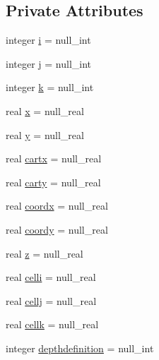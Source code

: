 \subsection*{Private Attributes}
\begin{DoxyCompactItemize}
\item 
integer \mbox{\hyperlink{structmodulelagrangianglobal_1_1t__position_af745ee6a210934fb981a149ae28ca6d4}{i}} = null\+\_\+int
\item 
integer \mbox{\hyperlink{structmodulelagrangianglobal_1_1t__position_ab99a1e12ce13909aae62e74a14dc0585}{j}} = null\+\_\+int
\item 
integer \mbox{\hyperlink{structmodulelagrangianglobal_1_1t__position_aae3f60b09150d9bec7d2f574b0bd8ecf}{k}} = null\+\_\+int
\item 
real \mbox{\hyperlink{structmodulelagrangianglobal_1_1t__position_ae10ba11e0f047cf9813bc1352e8da7e9}{x}} = null\+\_\+real
\item 
real \mbox{\hyperlink{structmodulelagrangianglobal_1_1t__position_a43baf1ee3465c8f6f57dae876045d290}{y}} = null\+\_\+real
\item 
real \mbox{\hyperlink{structmodulelagrangianglobal_1_1t__position_afb00ff6e531d7837c6c1c2917f4bff6f}{cartx}} = null\+\_\+real
\item 
real \mbox{\hyperlink{structmodulelagrangianglobal_1_1t__position_a610ac2aa6f3adea2efcbd677201a5ec0}{carty}} = null\+\_\+real
\item 
real \mbox{\hyperlink{structmodulelagrangianglobal_1_1t__position_ac4ffc10253f2729406cbc21416c5646a}{coordx}} = null\+\_\+real
\item 
real \mbox{\hyperlink{structmodulelagrangianglobal_1_1t__position_ac759900575ba7079e943d89c2de19517}{coordy}} = null\+\_\+real
\item 
real \mbox{\hyperlink{structmodulelagrangianglobal_1_1t__position_a2ff1e683bb89b4f5dca0c0a5385e9a4e}{z}} = null\+\_\+real
\item 
real \mbox{\hyperlink{structmodulelagrangianglobal_1_1t__position_a92f50dce6255330460a4d2b6ab7dfe2c}{celli}} = null\+\_\+real
\item 
real \mbox{\hyperlink{structmodulelagrangianglobal_1_1t__position_a96e100986a5800c6237f64b85757691b}{cellj}} = null\+\_\+real
\item 
real \mbox{\hyperlink{structmodulelagrangianglobal_1_1t__position_ab0ff668eb316d7445d36e4ae5c4f48ac}{cellk}} = null\+\_\+real
\item 
integer \mbox{\hyperlink{structmodulelagrangianglobal_1_1t__position_a871340bc1ceb4ecd282706047a8ab9c1}{depthdefinition}} = null\+\_\+int

\end{DoxyCompactItemize}
